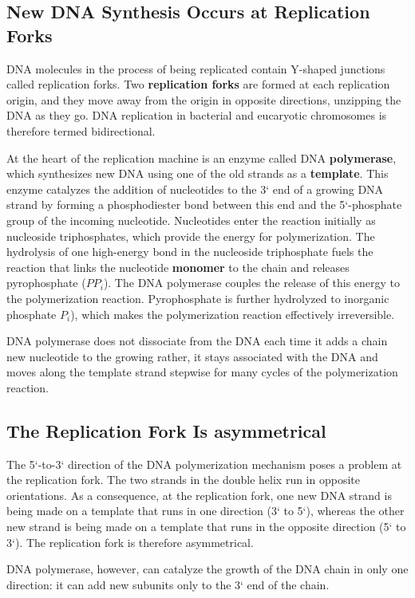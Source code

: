 \subsection{New DNA Synthesis Occurs at Replication Forks}

DNA molecules in the process of being replicated contain Y-shaped junctions
called replication forks. Two \textbf{replication forks} are formed at each replication origin, and
they move away from the origin in opposite directions, unzipping the DNA
as they go. DNA replication in bacterial and eucaryotic chromosomes
is therefore termed bidirectional.

At the heart of the replication machine is an enzyme called DNA
\textbf{polymerase}, which synthesizes new DNA using one of the old strands
as a \textbf{template}. This enzyme catalyzes the addition of nucleotides to the 3`
end of a growing DNA strand by forming a phosphodiester bond between
this end and the 5`-phosphate group of the incoming nucleotide.
Nucleotides enter the reaction initially as nucleoside triphosphates,
which provide the energy for polymerization. The hydrolysis of one high-energy
bond in the nucleoside triphosphate fuels the reaction that links
the nucleotide \textbf{monomer} to the chain and releases pyrophosphate ($PP_{i}$).
The DNA polymerase couples the release of this energy to the polymerization
reaction. Pyrophosphate is further hydrolyzed to inorganic
phosphate $P_i$), which makes the polymerization reaction effectively irreversible.

DNA polymerase does not dissociate from the DNA each time it adds a chain
new nucleotide to the growing rather, it stays associated with the
DNA and moves along the template strand stepwise for many cycles of
the polymerization reaction.

\subsection{The Replication Fork Is asymmetrical}

The 5`-to-3` direction of the DNA polymerization mechanism poses a
problem at the replication fork.
The two strands in the double helix run in
opposite orientations. As a consequence, at the replication fork, one new
DNA strand is being made on a template that runs in one direction (3`
to 5`), whereas the other new strand is being made on a template that
runs in the opposite direction (5` to 3`). The replication fork is therefore
asymmetrical.

DNA polymerase, however, can catalyze the growth of the DNA chain in
only one direction: it can add new subunits only to the 3` end of the chain.

